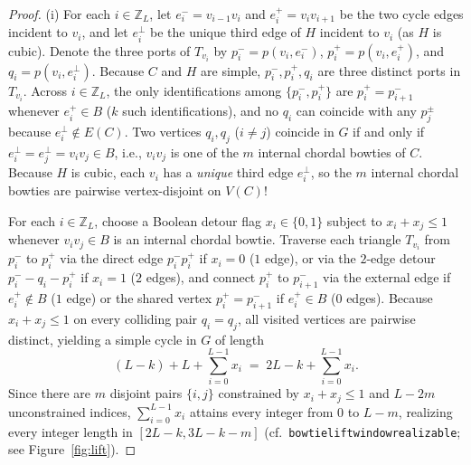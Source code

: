 \documentclass[11pt,reqno]{amsart}
\theoremstyle{plain}
\theoremstyle{definition}
\theoremstyle{remark}
\DeclareRobustCommand{\_}{\ifmmode\text{\textunderscore}\else\textunderscore\allowbreak\fi}
\begin{document}
\begin{proof}
(i) For each $i \in \mathbb{Z}_L$, let $e_i^- = v_{i-1} v_i$ and $e_i^+ = v_i v_{i+1}$ be the two cycle edges incident to $v_i$, and let $e_i^\perp$ be the unique third edge of $H$ incident to $v_i$ (as $H$ is cubic). Denote the three ports of $T_{v_i}$ by $p_i^- = p(v_i, e_i^-)$, $p_i^+ = p(v_i, e_i^+)$, and $q_i = p(v_i, e_i^\perp)$. Because $C$ and $H$ are simple, $p_i^-, p_i^+, q_i$ are three distinct ports in $T_{v_i}$. Across $i \in \mathbb{Z}_L$, the only identifications among $\{p_i^-, p_i^+\}$ are $p_i^+ = p_{i+1}^-$ whenever $e_i^+ \in B$ ($k$ such identifications), and no $q_i$ can coincide with any $p_j^\pm$ because $e_i^\perp \notin E(C)$. Two vertices $q_i, q_j$ ($i \neq j$) coincide in $G$ if and only if $e_i^\perp = e_j^\perp = v_i v_j \in B$, i.e., $v_i v_j$ is one of the $m$ internal chordal bowties of $C$. Because $H$ is cubic, each $v_i$ has a \emph{unique} third edge $e_i^\perp$, so the $m$ internal chordal bowties are pairwise vertex-disjoint on $V(C)$!

For each $i \in \mathbb{Z}_L$, choose a Boolean detour flag $x_i \in \{0, 1\}$ subject to $x_i + x_j \le 1$ whenever $v_i v_j \in B$ is an internal chordal bowtie. Traverse each triangle $T_{v_i}$ from $p_i^-$ to $p_i^+$ via the direct edge $p_i^- p_i^+$ if $x_i = 0$ ($1$ edge), or via the $2$-edge detour $p_i^- - q_i - p_i^+$ if $x_i = 1$ ($2$ edges), and connect $p_i^+$ to $p_{i+1}^-$ via the external edge if $e_i^+ \notin B$ ($1$ edge) or the shared vertex $p_i^+ = p_{i+1}^-$ if $e_i^+ \in B$ ($0$ edges). Because $x_i + x_j \le 1$ on every colliding pair $q_i = q_j$, all visited vertices are pairwise distinct, yielding a simple cycle in $G$ of length
\[
  (L - k) + L + \sum_{i=0}^{L-1} x_i \;=\; 2L - k + \sum_{i=0}^{L-1} x_i.
\]
Since there are $m$ disjoint pairs $\{i, j\}$ constrained by $x_i + x_j \le 1$ and $L - 2m$ unconstrained indices, $\sum_{i=0}^{L-1} x_i$ attains every integer from $0$ to $L - m$, realizing every integer length in $[2L - k, 3L - k - m]$ (cf.\ \texttt{bowtie\_lift\_window\_realizable}; see Figure~\ref{fig:lift}).


\end{proof}
\end{document}

